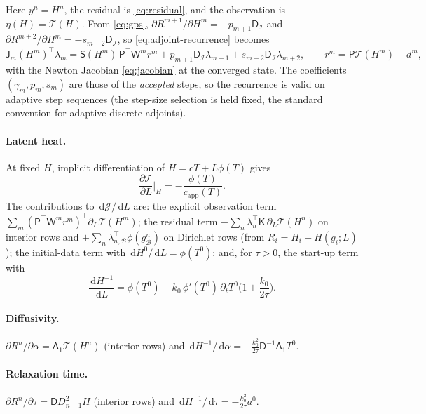 \documentclass[11pt]{article}
\numberwithin{equation}{section}
\theoremstyle{remark}
\newcommand{\dd}{\,\mathrm{d}}
\newcommand{\Dm}{\mathsf{D}}           %
\newcommand{\K}{\mathsf{K}}
\newcommand{\Pobs}{\mathsf{P}}
\newcommand{\capp}{c_{\mathrm{app}}}
\begin{document}
Here $y^n=H^n$, the residual is \eqref{eq:residual}, and the observation is
$\eta(H)=\mathcal T(H)$.  From \eqref{eq:gps},
$\partial R^{m+1}/\partial H^m=-p_{m+1}\Dm_{\mathcal I}$ and
$\partial R^{m+2}/\partial H^m=-s_{m+2}\Dm_{\mathcal I}$, so
\eqref{eq:adjoint-recurrence} becomes
\begin{equation}
  \mathsf J_m(H^m)^{\!\top}\lambda_m
  = \mathsf S(H^m)\,\Pobs^{\!\top}\mathsf W^mr^m
  + p_{m+1}\Dm_{\mathcal I}\lambda_{m+1}+s_{m+2}\Dm_{\mathcal I}\lambda_{m+2},
  \qquad r^m=\Pobs\mathcal T(H^m)-d^m,
  \label{eq:enthalpy-adjoint}
\end{equation}
with the Newton Jacobian \eqref{eq:jacobian} at the converged state.  The
coefficients $(\gamma_m,p_m,s_m)$ are those of the \emph{accepted} steps, so
the recurrence is valid on adaptive step sequences (the step-size selection is
held fixed, the standard convention for adaptive discrete adjoints).

\paragraph{Latent heat.}  At fixed $H$, implicit differentiation of
$H=cT+L\phi(T)$ gives
\begin{equation}
  \frac{\partial\mathcal T}{\partial L}\Big|_H = -\frac{\phi(T)}{\capp(T)} .
  \label{eq:dTdL}
\end{equation}
The contributions to $\dd\mathcal J/\dd L$ are: the explicit observation term
$\sum_m (\Pobs^{\!\top}\mathsf W^mr^m)^{\!\top}\partial_L\mathcal T(H^m)$; the
residual term $-\sum_n\lambda_n^{\!\top}\K\,\partial_L\mathcal T(H^n)$ on
interior rows and $+\sum_n\lambda_{n,\mathcal B}^{\!\top}\phi(g^n_{\mathcal B})$ on
Dirichlet rows (from $R_i=H_i-H(g_i;L)$); the initial-data term with
$\dd H^0/\dd L=\phi(T^0)$; and, for $\tau>0$, the start-up term with
\begin{equation}
  \frac{\dd H^{-1}}{\dd L} = \phi(T^0) - k_0\,\phi'(T^0)\,\partial_tT^0\Big(1+\frac{k_0}{2\tau}\Big).
\end{equation}

\paragraph{Diffusivity.}  $\partial R^n/\partial\alpha=\mathsf A_1\mathcal T(H^n)$
(interior rows) and $\dd H^{-1}/\dd\alpha=-\frac{k_0^2}{2\tau}\Dm^{-1}\mathsf A_1T^0$.

\paragraph{Relaxation time.}  $\partial R^n/\partial\tau=\Dm D^2_{n-1}H$
(interior rows) and $\dd H^{-1}/\dd\tau=-\frac{k_0^2}{2\tau}a^0$.
\end{document}
